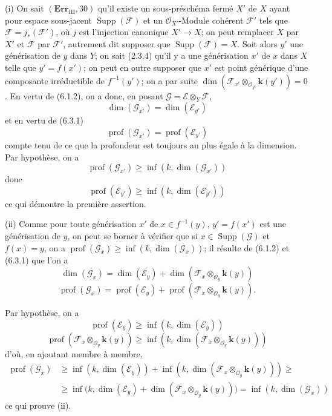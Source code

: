 (i) On sait $(\mathbf{Err}_{\mathrm{III}},30)$ qu'il existe un sous-préschéma
fermé $X'$ de $X$ ayant pour espace sous-jacent
$\operatorname{Supp}(\mathscr F)$ et un $\mathcal O_{X'}$-Module cohérent
$\mathscr F'$ tels que $\mathscr F=j_*(\mathscr F')$, où $j$ est l'injection
canonique $X'\to X$; on peut remplacer $X$ par $X'$ et $\mathscr F$ par
$\mathscr F'$, autrement dit supposer que
$\operatorname{Supp}(\mathscr F)=X$. Soit alors $y'$ une générisation de $y$
dans $Y$; on sait (2.3.4) qu'il y a une générisation $x'$ de $x$ dans $X$
telle que $y'=f(x')$; on peut en outre supposer que $x'$ est point générique
d'une composante irréductible de $f^{-1}(y')$; on a par suite
$\dim(\mathscr F_{x'}\otimes_{\mathcal O_{y'}}\boldsymbol{k}(y'))=0$. En vertu de (6.1.2),
on a donc, en posant $\mathscr G=\mathscr E\otimes_Y\mathscr F$,
\[
\dim(\mathscr G_{x'})=\dim(\mathscr E_{y'})
\]
et en vertu de (6.3.1)
\[
\operatorname{prof}(\mathscr G_{x'})=\operatorname{prof}(\mathscr E_{y'})
\]
compte tenu de ce que la profondeur est toujours au plus égale à la
dimension. Par hypothèse, on a
\[
\operatorname{prof}(\mathscr G_{x'})
\geq\inf(k,\dim(\mathscr G_{x'}))
\]
donc
\[
\operatorname{prof}(\mathscr E_{y'})
\geq\inf(k,\dim(\mathscr E_{y'}))
\]
ce qui démontre la première assertion.


(ii) Comme pour toute générisation $x'$ de $x\in f^{-1}(y)$,
$y'=f(x')$ est une générisation de $y$, on peut se borner à vérifier que si
$x\in\operatorname{Supp}(\mathscr G)$ et $f(x)=y$, on a
$\operatorname{prof}(\mathscr G_x)\geq\inf(k,\dim(\mathscr G_x))$; il résulte
de (6.1.2) et (6.3.1) que l'on a
\[
\dim(\mathscr G_x)=\dim(\mathscr E_y)+
\dim(\mathscr F_x\otimes_{\mathcal O_y}\boldsymbol{k}(y))
\]
\[
\operatorname{prof}(\mathscr G_x)=\operatorname{prof}(\mathscr E_y)+
\operatorname{prof}(\mathscr F_x\otimes_{\mathcal O_y}\boldsymbol{k}(y)).
\]

Par hypothèse, on a
\[
\operatorname{prof}(\mathscr E_y)\geq\inf(k,\dim(\mathscr E_y))
\]
\[
\operatorname{prof}(\mathscr F_x\otimes_{\mathcal O_y}\boldsymbol{k}(y))
\geq\inf(k,\dim(\mathscr F_x\otimes_{\mathcal O_y}\boldsymbol{k}(y)))
\]
d'où, en ajoutant membre à membre,
\begin{align*}
\operatorname{prof}(\mathscr G_x)
&\geq\inf(k,\dim(\mathscr E_y))
+\inf(k,\dim(\mathscr F_x\otimes_{\mathcal O_y}\boldsymbol{k}(y)))\geq{}\\
&\geq\inf\bigl(k,\dim(\mathscr E_y)
+\dim(\mathscr F_x\otimes_{\mathcal O_y}\boldsymbol{k}(y))\bigr)
=\inf(k,\dim(\mathscr G_x))
\end{align*}
ce qui prouve (ii).

